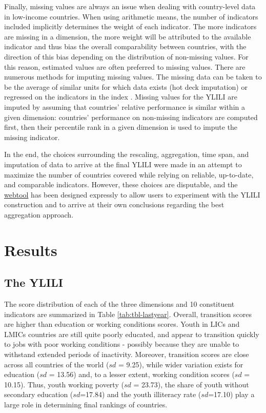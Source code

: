 \documentclass[
  a4paper, twoside, 12pt]{book}
\begin{document}
Finally, missing values are always an issue when dealing with country-level data in low-income countries. When using arithmetic means, the number of indicators included implicitly determines the weight of each indicator. The more indicators are missing in a dimension, the more weight will be attributed to the available indicator and thus bias the overall comparability between countries, with the direction of this bias depending on the distribution of non-missing values. For this reason, estimated values are often preferred to missing values. There are numerous methods for imputing missing values. The missing data can be taken to be the average of similar units for which data exists (hot deck imputation) or regressed on the indicators in the index \autocite{oecd2008,wef2018}. Missing values for the YLILI are imputed by assuming that countries' relative performance is similar within a given dimension: countries' performance on non-missing indicators are computed first, then their percentile rank in a given dimension is used to impute the missing indicator.

In the end, the choices surrounding the rescaling, aggregation, time span, and imputation of data to arrive at the final YLILI were made in an attempt to maximize the number of countries covered while relying on reliable, up-to-date, and comparable indicators. However, these choices are disputable, and the \href{https://nadel.shinyapps.io/ylili/}{webtool} has been designed expressly to allow users to experiment with the YLILI construction and to arrive at their own conclusions regarding the best aggregation approach.

\hypertarget{ylili_results}{%
\section{Results}\label{ylili_results}}

\hypertarget{the-ylili}{%
\subsection{The YLILI}\label{the-ylili}}

The score distribution of each of the three dimensions and 10 constituent indicators are summarized in Table \ref{tab:tbl-lastyear}. Overall, transition scores are higher than education or working conditions scores. Youth in LICs and LMICs countries are still quite poorly educated, and appear to transition quickly to jobs with poor working conditions - possibly because they are unable to withstand extended periods of inactivity. Moreover, transition scores are close across all countries of the world (\(sd\) = 9.25), while wider variation exists for education (\(sd\) = 13.56) and, to a lesser extent, working condition scores (\(sd\) = 10.15). Thus, youth working poverty (\(sd\) = 23.73), the share of youth without secondary education (\(sd\)=17.84) and the youth illiteracy rate (\(sd\)=17.10) play a large role in determining final rankings of countries.
\end{document}
